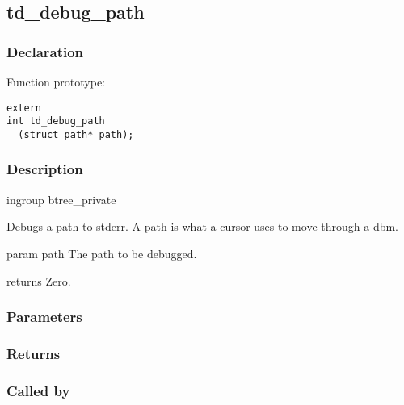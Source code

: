 
\newpage
\subsection{td\_debug\_path}
\subsubsection{Declaration} Function prototype:

\begin{verbatim}
extern
int td_debug_path
  (struct path* path);
\end{verbatim}

\subsubsection{Description}


 ingroup btree\_private

 Debugs a path to stderr. A path is what a cursor uses to move through a dbm.

 param path The path to be debugged.

 returns Zero.
 

\subsubsection{Parameters}
\subsubsection{Returns}
\subsubsection{Called by}
